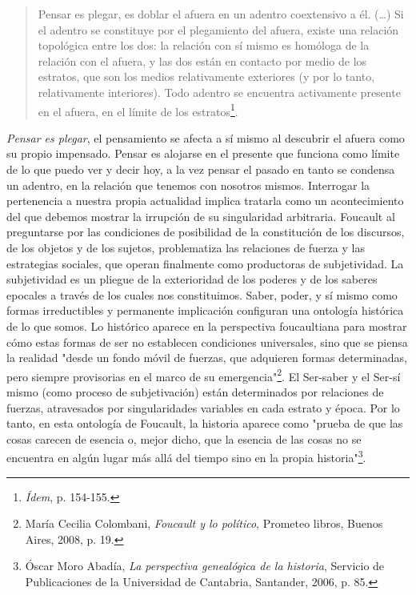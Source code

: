 \begin{quote}
Pensar es plegar, es doblar el afuera en un adentro coextensivo a él.
(\dots) Si el adentro se constituye por el plegamiento del afuera,
existe una relación topológica entre los dos: la relación con sí mismo
es homóloga de la relación con el afuera, y las dos están en contacto
por medio de los estratos, que son los medios relativamente exteriores
(y por lo tanto, relativamente interiores). Todo adentro se encuentra
activamente presente en el afuera, en el límite de los
estratos\footnote{\emph{Ídem}, p. 154-155.}.
\end{quote}

\emph{Pensar es plegar}, el pensamiento se afecta a sí mismo al
descubrir el afuera como su propio impensado. Pensar es alojarse en el
presente que funciona como límite de lo que puedo ver y decir hoy, a la
vez pensar el pasado en tanto se condensa un adentro, en la relación que
tenemos con nosotros mismos. Interrogar la pertenencia a nuestra propia
actualidad implica tratarla como un acontecimiento del que debemos
mostrar la irrupción de su singularidad arbitraria. Foucault al
preguntarse por las condiciones de posibilidad de la constitución de los
discursos, de los objetos y de los sujetos, problematiza las relaciones
de fuerza y las estrategias sociales, que operan finalmente como
productoras de subjetividad. La subjetividad es un pliegue de la
exterioridad de los poderes y de los saberes epocales a través de los
cuales nos constituimos. Saber, poder, y sí mismo como formas
irreductibles y permanente implicación configuran una ontología
histórica de lo que somos. Lo histórico aparece en la perspectiva
foucaultiana para mostrar cómo estas formas de ser no establecen
condiciones universales, sino que se piensa la realidad "desde un fondo
móvil de fuerzas, que adquieren formas determinadas, pero siempre
provisorias en el marco de su emergencia"\footnote{María Cecilia
  Colombani, \emph{Foucault y lo político}, Prometeo libros, Buenos
  Aires, 2008, p. 19.}. El Ser-saber y el Ser-sí mismo (como proceso de
subjetivación) están determinados por relaciones de fuerzas, atravesados
por singularidades variables en cada estrato y época. Por lo tanto, en
esta ontología de Foucault, la historia aparece como "prueba de que las
cosas carecen de esencia o, mejor dicho, que la esencia de las cosas no
se encuentra en algún lugar más allá del tiempo sino en la propia
historia"\footnote{Óscar Moro Abadía, \emph{La perspectiva genealógica
  de la historia}, Servicio de Publicaciones de la Universidad de
  Cantabria, Santander, 2006, p. 85.}.

